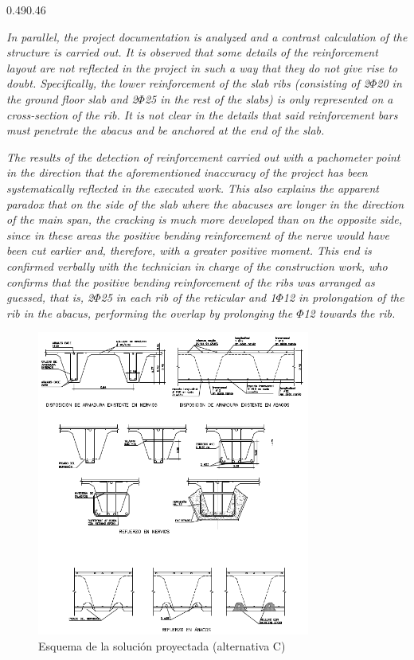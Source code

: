 \documentclass[a4paper,11pt ]{xc_webpage_project}
\renewcommand{\widhtLeftCol}{0.49\textwidth} %
\renewcommand{\widhtRightCol}{0.46\textwidth} %
\begin{document}
\begin{Parallel}{\widhtLeftCol}{\widhtRightCol}
{     \emph{In parallel, the project documentation is analyzed and a contrast calculation of the structure is carried out. It is observed that some details of the reinforcement layout are not reflected in the project in such a way that they do not give rise to doubt. Specifically, the lower reinforcement of the slab ribs (consisting of 2$\Phi$20 in the ground floor slab and 2$\Phi$25 in the rest of the slabs) is only represented on a cross-section of the rib. It is not clear in the details that said reinforcement bars must penetrate the abacus and be anchored at the end of the slab.}
    
     \emph{The results of the detection of reinforcement carried out with a pachometer point in the direction that the aforementioned inaccuracy of the project has been systematically reflected in the executed work. This also explains the apparent paradox that on the side of the slab where the abacuses are longer in the direction of the main span, the cracking is much more developed than on the opposite side, since in these areas the positive bending reinforcement of the nerve would have been cut earlier and, therefore, with a greater positive moment. This end is confirmed verbally with the technician in charge of the construction work, who confirms that the positive bending reinforcement of the ribs was arranged as guessed, that is, 2$\Phi$25 in each rib of the reticular and 1$\Phi$12 in prolongation of the rib in the abacus, performing the overlap by prolonging the $\Phi$12 towards the rib.}
     }
\end{Parallel}
\begin{figure}
  \centering
  \includegraphics[width=0.8\textwidth]{figures/solucionC}
  \caption{Esquema de la solución proyectada (alternativa C)}
\end{figure}
\end{document}
